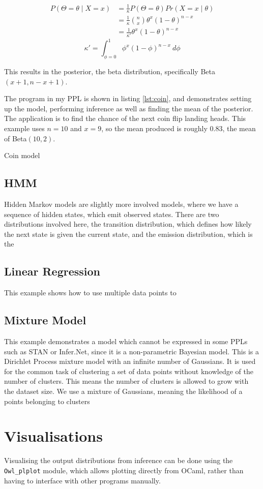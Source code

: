 \begin{align*}						
	P(\Theta=\theta \mid X=x) & = \frac{1}{\kappa}P(\Theta=\theta)Pr(X=x\mid\theta)    \\ 
	                          & = \frac{1}{\kappa}\binom{n}{x}\theta^x(1-\theta)^{n-x} \\
	                          & = \frac{1}{\kappa'}\theta^x(1-\theta)^{n-x}            
\end{align*}
$$\kappa'=\int_{\phi=0}^1\phi^x(1-\phi)^{n-x}~d\phi$$                        
	
This results in the posterior, the beta distribution, specifically Beta$(x+1,n-x+1)$. 
	
The program in my PPL is shown in listing \ref{lst:coin}, and demonstrates setting up the model, performing inference as well as finding the mean of the posterior. The application is to find the chance of the next coin flip landing heads. This example uses $n=10$ and $x=9$, so the mean produced is roughly 0.83, the mean of Beta$(10,2)$.
	
\begin{listing}[!ht]
	\caption{Coin model}
	\label{lst:coin}
\end{listing}
	
\subsection{HMM}
Hidden Markov models are slightly more involved models, where we have a sequence of hidden states, which emit observed states. There are two distributions involved here, the transition distribution, which defines how likely the next state is given the current state, and the emission distribution, which is the 
	
\subsection{Linear Regression}
This example shows how to use multiple data points to 
	
\subsection{Mixture Model}
This example demonstrates a model which cannot be expressed in some PPLs such as STAN or Infer.Net, since it is a non-parametric Bayesian model. This is a Dirichlet Process mixture model with an infinite number of Gaussians\cite{dpmm}. It is used for the common task of clustering a set of data points without knowledge of the number of clusters. This means the number of clusters is allowed to grow with the dataset size. We use a mixture of Gaussians, meaning the likelihood of a points belonging to clusters 

\section{Visualisations}
Visualising the output distributions from inference can be done using the \texttt{Owl\_plplot} module, which allows plotting directly from OCaml, rather than having to interface with other programs manually.